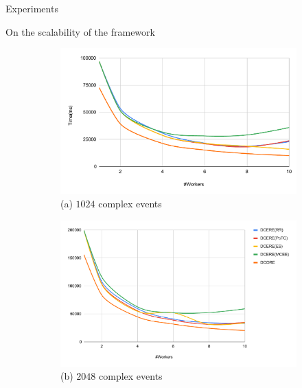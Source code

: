 \documentclass[xcolor=pdftex,dvipsnames,table]{beamer}
\begin{document}
\begin{frame}{Experiments}
  \begin{block}{On the scalability of the framework}
    \begin{figure}[H]
        \centering
        \begin{subfigure}[b]{0.49\textwidth}
            \centering
            \includegraphics[width=\textwidth]{experiment_3_chart_1}
            \tiny (a) $1024$ complex events
        \end{subfigure}
        \begin{subfigure}[b]{0.49\textwidth}
            \centering
            \includegraphics[width=\textwidth]{experiment_3_chart_2}
            \tiny (b) $2048$ complex events
        \end{subfigure}
    \end{figure}
  \end{block}
\end{frame}

\end{document}
